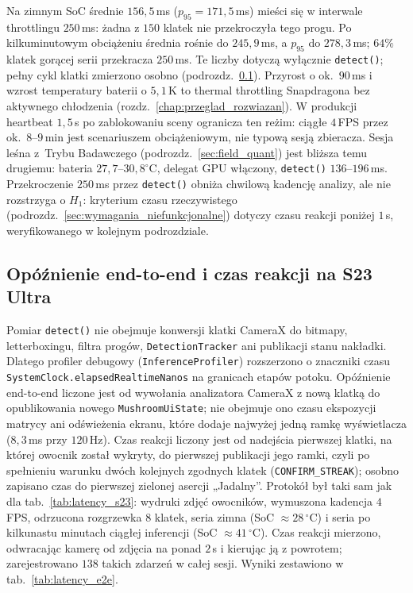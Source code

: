 Na zimnym SoC średnie $156{,}5$\,ms ($p_{95}=171{,}5$\,ms) mieści się w interwale throttlingu $250$\,ms: żadna z $150$ klatek nie przekroczyła tego progu. Po kilkuminutowym obciążeniu średnia rośnie do $245{,}9$\,ms, a $p_{95}$ do $278{,}3$\,ms; $64\%$ klatek gorącej serii przekracza $250$\,ms. Te liczby dotyczą wyłącznie \texttt{detect()}; pełny cykl klatki zmierzono osobno (podrozdz.~\ref{sec:latency_e2e}). Przyrost o ok.\ $90$\,ms i wzrost temperatury baterii o $5{,}1$\,K to thermal throttling Snapdragona bez aktywnego chłodzenia (rozdz.~\ref{chap:przeglad_rozwiazan}). W produkcji heartbeat $1{,}5$\,s po zablokowaniu sceny ogranicza ten reżim: ciągłe $4$\,FPS przez ok.\ $8$--$9$\,min jest scenariuszem obciążeniowym, nie typową sesją zbieracza. Sesja leśna z~Trybu Badawczego (podrozdz.~\ref{sec:field_quant}) jest bliższa temu drugiemu: bateria $27{,}7$--$30{,}8^{\circ}\mathrm{C}$, delegat GPU włączony, \texttt{detect()} $136$--$196$\,ms. Przekroczenie $250$\,ms przez \texttt{detect()} obniża chwilową kadencję analizy, ale nie rozstrzyga o $H_1$: kryterium czasu rzeczywistego (podrozdz.~\ref{sec:wymagania_niefunkcjonalne}) dotyczy czasu reakcji poniżej $1$\,s, weryfikowanego w kolejnym podrozdziale.

\subsection{Opóźnienie end-to-end i czas reakcji na S23 Ultra}\label{sec:latency_e2e}
Pomiar \texttt{detect()} nie obejmuje konwersji klatki CameraX do bitmapy, letterboxingu, filtra progów, \texttt{DetectionTracker} ani publikacji stanu nakładki. Dlatego profiler debugowy (\texttt{InferenceProfiler}) rozszerzono o znaczniki czasu \texttt{SystemClock.elapsedRealtimeNanos} na granicach etapów potoku. Opóźnienie end-to-end liczone jest od wywołania analizatora CameraX z nową klatką do opublikowania nowego \texttt{MushroomUiState}; nie obejmuje ono czasu ekspozycji matrycy ani odświeżenia ekranu, które dodaje najwyżej jedną ramkę wyświetlacza ($8{,}3$\,ms przy $120$\,Hz). Czas reakcji liczony jest od nadejścia pierwszej klatki, na której owocnik został wykryty, do pierwszej publikacji jego ramki, czyli po spełnieniu warunku dwóch kolejnych zgodnych klatek (\texttt{CONFIRM\_STREAK}); osobno zapisano czas do pierwszej zielonej asercji „Jadalny”. Protokół był taki sam jak dla tab.~\ref{tab:latency_s23}: wydruki zdjęć owocników, wymuszona kadencja $4$\,FPS, odrzucona rozgrzewka $8$ klatek, seria zimna (SoC $\approx 28\,^\circ$C) i seria po kilkunastu minutach ciągłej inferencji (SoC $\approx 41\,^\circ$C). Czas reakcji mierzono, odwracając kamerę od zdjęcia na ponad $2$\,s i kierując ją z powrotem; zarejestrowano $138$ takich zdarzeń w całej sesji. Wyniki zestawiono w tab.~\ref{tab:latency_e2e}.

